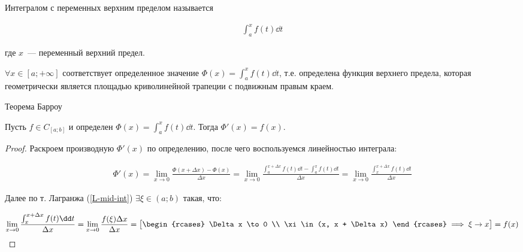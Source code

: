 
\begin{minipage}{\linewidth}
  \begin{multicols*}{2}
  
  \columnbreak

  \begin{definition}
    Интегралом с переменных верхним пределом называется
    
    \begin{align*}
      \int_{a}^{x} f(t) \dd t
    \end{align*}

    где \(x\)~--- переменный верхний предел.
  \end{definition}
  \end{multicols*}
\end{minipage}

\begin{remark}
  \(\forall x \in [a; +\infty]\) соответствует определенное значение
  \(\Phi(x) = \int_{a}^{x} f(t) \dd t\), т.е. определена функция верхнего
  предела, которая геометрически является площадью криволинейной трапеции
  с подвижным правым краем.
\end{remark}

\begin{theorem}\label{Barrow}
  Теорема Барроу

  Пусть \(f \in C_{[a; b]}\) и определен \(\Phi(x) = \int_{a}^{x} f(t) \dd t\).
  Тогда \(\Phi'(x) = f(x)\).
\end{theorem}
\begin{proof}
  Раскроем производную \(\Phi'(x)\) по определению, после чего воспользуемся
  линейностью интеграла:

  \begin{align*}
    \Phi'(x)
    = \lim_{x \to 0} \frac{\Phi(x + \Delta x) - \Phi(x)}{\Delta x}
    = \lim_{x \to 0} \frac{
      \int_{a}^{x + \Delta x} f(t) \dd t - \int_{a}^{x} f(t) \dd t
    }{\Delta x}
    = \lim_{x \to 0} \frac{\int_{x}^{x + \Delta x} f(t) \dd t}{\Delta x}
  \end{align*}

  Далее по т. Лагранжа (\ref{L-mid-int}) \(\exists \xi \in (a; b)\) такая, что:

  \begin{align*}
    \lim_{x \to 0} \frac{\int_{x}^{x + \Delta x} f(t) \dd t}{\Delta x}
    = \lim_{x \to 0} \frac{f(\xi) \Delta x}{\Delta x}
    = \begin{bmatrix}
      \begin{rcases}
        \Delta x \to 0 \\
        \xi \in (x, x + \Delta x)
      \end{rcases}
      \implies \xi \to x
    \end{bmatrix}
    = f(x)
  \end{align*}
\end{proof}